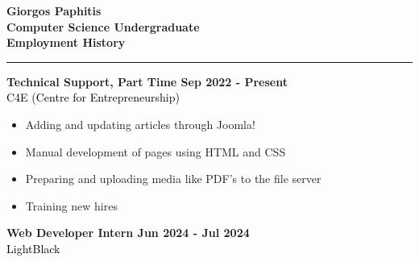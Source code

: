 \documentclass[12pt]{article}
\begin{document}
\begin{paracol}{2}
\begin{tcolorbox}[colback=bgcolor, colframe=bgcolor, boxrule=0cm, arc=0cm, outer arc=0cm, left=0.35cm, right=0.10cm, top=1cm, bottom=1.5cm,height=\textheight]
{\begin{itemize}[leftmargin=15pt, itemsep=0pt, topsep=0pt]
      \end{itemize}
      }
   \end{tcolorbox}
   \switchcolumn
      \vspace*{1.7cm}
      \textbf{\Huge \textcolor{bgcolor}{Giorgos Paphitis}}\\[0.5em]
      \textbf{Computer Science Undergraduate}\\
      \vspace{1.5cm}
      {\fontsize{14pt}{13pt}\selectfont
      \textbf{\textcolor{bgcolor}{Employment History}}\\[0.3em]
      }
      \hrule
      \vspace{0.5cm}
      \textbf{\textcolor{bgcolor}{Technical Support, Part Time \hfill Sep 2022 - Present}}\\[0.5em]
      \textcolor{black}{C4E (Centre for Entrepreneurship)}\\[0.5em]
      {\renewcommand{\labelitemi}{\textcolor{bgcolor}{\normalsize$\bullet$}}%
      \begin{itemize}[leftmargin=33pt, itemsep=0pt, topsep=0pt]
            \item Adding and updating articles through Joomla!\\
            \item Manual development of pages using HTML and CSS\\
            \item Preparing and uploading media like PDF's to the file server\\
            \item Training new hires\\
         \end{itemize}
      }
      \vspace{0.5cm}
      \textbf{\textcolor{bgcolor}{Web Developer Intern \hfill Jun 2024 - Jul 2024}}\\[0.5em]
      \textcolor{black}{LightBlack}\\[0.5em]

\end{paracol}
\end{document}
